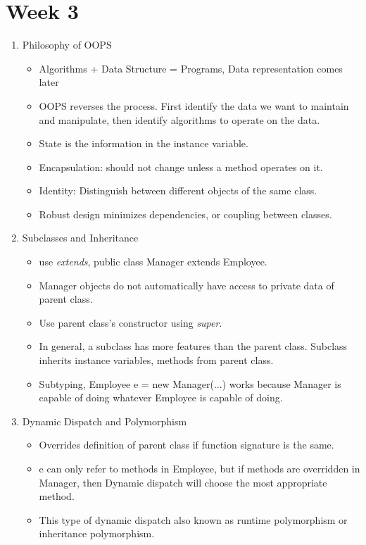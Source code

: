 \documentclass[a4paper]{article}
\begin{document}
\section{Week 3}
\begin{enumerate}
    \item Philosophy of OOPS
    \begin{itemize}
        \item Algorithms + Data Structure = Programs, Data representation comes later
        \item OOPS reverses the process. First identify the data we want to maintain and manipulate, then identify algorithms to operate on the data.
        \item State is the information in the instance variable.
        \item Encapsulation: should not change unless a method operates on it.
        \item Identity: Distinguish between different objects of the same class.
        \item Robust design minimizes dependencies, or coupling between classes.
    \end{itemize}
    \item Subclasses and Inheritance
    \begin{itemize}
        \item use \textit{extends}, public class Manager extends Employee.
        \item Manager objects do not automatically have access to private data of parent class.
        \item Use parent class's constructor using \textit{super}.
        \item In general, a subclass has more features than the parent class. Subclass inherits instance variables, methods from parent class.
        \item Subtyping, Employee e = new Manager(...) works because Manager is capable of doing whatever Employee is capable of doing.
    \end{itemize}
    \item Dynamic Dispatch and Polymorphism
    \begin{itemize}
        \item Overrides definition of parent class if function signature is the same.
        \item e can only refer to methods in Employee, but if methods are overridden in Manager, then Dynamic dispatch will choose the most appropriate method.
        \item This type of dynamic dispatch also known as runtime polymorphism or inheritance polymorphism.

\end{itemize}
\end{enumerate}
\end{document}
